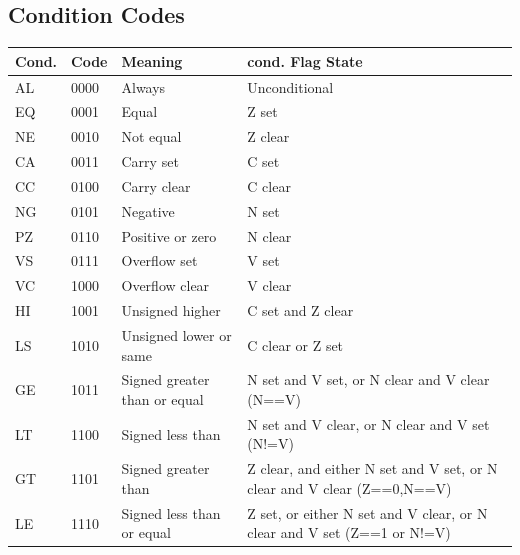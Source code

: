 \documentclass[12pt]{article}
\begin{document}
   \subsection{Condition Codes}   \begin{center}
   \begin{tabular}{|p{1.2cm}|p{1.2cm}|p{5.0cm}|p{7.0cm}|}
        \hline
        \textbf{Cond.} & \textbf{Code} & \textbf{Meaning} & \textbf{cond. Flag State}\\
        \hline
        AL & 0000 & Always & Unconditional\\
        \hline
        EQ & 0001 & Equal & Z set\\
        \hline
        NE & 0010 & Not equal & Z clear\\
        \hline
        CA & 0011 & Carry set & C set\\
        \hline
        CC & 0100 & Carry clear & C clear\\
        \hline
        NG & 0101 & Negative & N set\\
        \hline
        PZ & 0110 & Positive or zero & N clear\\
        \hline
        VS & 0111 & Overflow set & V set\\
        \hline
        VC & 1000 & Overflow clear & V clear\\
        \hline
        HI & 1001 & Unsigned higher & C set and Z clear\\
        \hline
        LS & 1010 & Unsigned lower or same & C clear or Z set\\
        \hline
        GE & 1011 & Signed greater than or equal & N set and V set,\newline
        or N clear and V clear (N==V)\\
        \hline
        LT & 1100 & Signed less than & N set and V clear,\newline
        or N clear and V set (N!=V)\\
        \hline
        GT & 1101 & Signed greater than & Z clear, and either N set and V set, or\newline
        N clear and V clear (Z==0,N==V)\\
        \hline
        LE & 1110 & Signed less than or equal & Z set, or either N set and V clear, or\newline
        N clear and V set (Z==1 or N!=V)\\
        \hline
   \end{tabular}
   \end{center}
   \newpage
   
\end{document}
